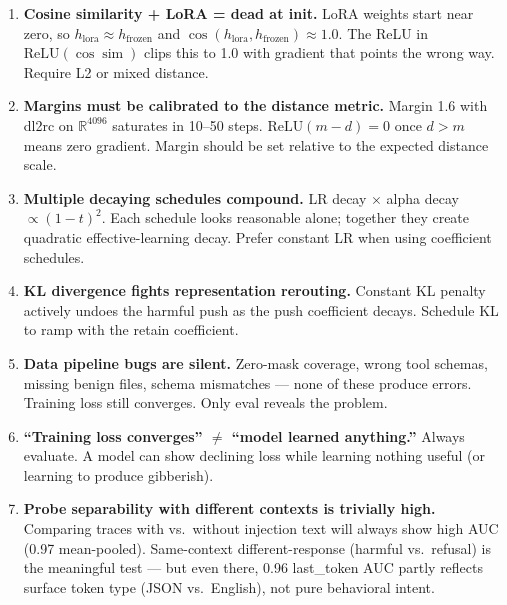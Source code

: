 \documentclass[11pt]{article}
\begin{document}
\begin{enumerate}
  \item \textbf{Cosine similarity + LoRA = dead at init.} LoRA weights start
        near zero, so $h_{\text{lora}} \approx h_{\text{frozen}}$ and
        $\cos(h_{\text{lora}}, h_{\text{frozen}}) \approx 1.0$. The ReLU in
        $\mathrm{ReLU}(\cos\!\operatorname{sim})$ clips this to 1.0 with gradient
        that points the wrong way. Require L2 or mixed distance.

  \item \textbf{Margins must be calibrated to the distance metric.} Margin 1.6
        with dl2rc on $\mathbb{R}^{4096}$ saturates in 10--50 steps.
        $\mathrm{ReLU}(m - d) = 0$ once $d > m$ means zero gradient.
        Margin should be set relative to the expected distance scale.

  \item \textbf{Multiple decaying schedules compound.} LR decay $\times$ alpha
        decay $\propto (1-t)^2$. Each schedule looks reasonable alone; together
        they create quadratic effective-learning decay. Prefer constant LR when
        using coefficient schedules.

  \item \textbf{KL divergence fights representation rerouting.} Constant KL
        penalty actively undoes the harmful push as the push coefficient decays.
        Schedule KL to ramp with the retain coefficient.

  \item \textbf{Data pipeline bugs are silent.} Zero-mask coverage, wrong tool
        schemas, missing benign files, schema mismatches --- none of these
        produce errors. Training loss still converges. Only eval reveals the problem.

  \item \textbf{``Training loss converges'' $\neq$ ``model learned anything.''}
        Always evaluate. A model can show declining loss while learning nothing
        useful (or learning to produce gibberish).

  \item \textbf{Probe separability with different contexts is trivially high.}
        Comparing traces with vs.\ without injection text will always show high
        AUC (0.97 mean-pooled). Same-context different-response (harmful vs.\
        refusal) is the meaningful test --- but even there, 0.96 last\_token AUC
        partly reflects surface token type (JSON vs.\ English), not pure
        behavioral intent.


\end{enumerate}
\end{document}
